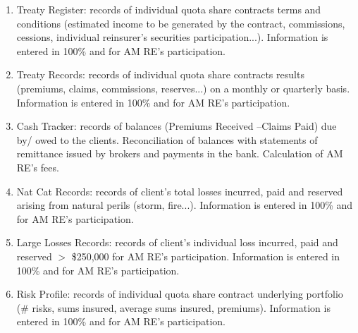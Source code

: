 \documentclass[12pt]{article}
\begin{document}
\begin{enumerate}
    \item Treaty Register: records of individual quota share contracts terms and conditions (estimated income to be generated by the contract, commissions, cessions, individual reinsurer’s securities participation...). Information is entered in 100\% and for AM RE’s participation.
    \item Treaty Records: records of individual quota share contracts results (premiums, claims, commissions, reserves...) on a monthly or quarterly basis. Information is entered in 100\% and for AM RE’s participation.
    \item Cash Tracker: records of balances (Premiums Received –Claims Paid) due by/ owed to the clients. Reconciliation of balances with statements of remittance issued by brokers and payments in the bank. Calculation of AM RE’s fees.
    \item Nat Cat Records: records of client’s total losses incurred, paid and reserved arising from natural perils (storm, fire...). Information is entered in 100\% and for AM RE’s participation.
    \item Large Losses Records: records of client’s individual loss incurred, paid and reserved $>$ \$250,000 for AM RE’s participation. Information is entered in 100\% and for AM RE’s participation.
    \item Risk Profile: records of individual quota share contract underlying portfolio (\# risks, sums insured, average sums insured, premiums). Information is entered in 100\% and for AM RE’s participation.
\end{enumerate}
\end{document}
